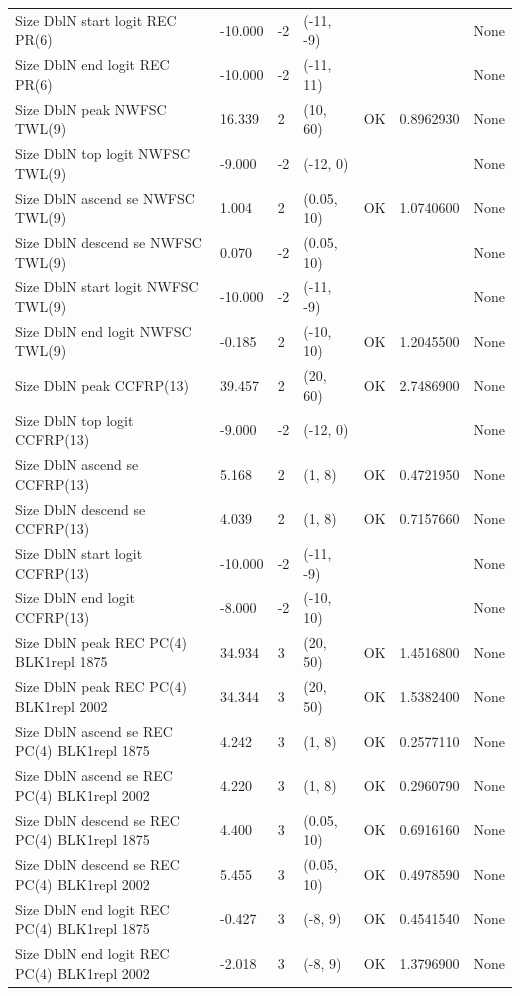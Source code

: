 \documentclass[11pt,
  english,
  a4paper,
]{article}
\begin{document}
\begin{landscape}
\begin{longtable}[t]{>{\raggedright\arraybackslash}p{8.5cm}lllll>{\raggedright\arraybackslash}p{4cm}}
Size DblN start logit REC PR(6) & -10.000 & -2 & (-11, -9) &  &  & None\\
Size DblN end logit REC PR(6) & -10.000 & -2 & (-11, 11) &  &  & None\\
Size DblN peak NWFSC TWL(9) & 16.339 & 2 & (10, 60) & OK & 0.8962930 & None\\
Size DblN top logit NWFSC TWL(9) & -9.000 & -2 & (-12, 0) &  &  & None\\
Size DblN ascend se NWFSC TWL(9) & 1.004 & 2 & (0.05, 10) & OK & 1.0740600 & None\\
Size DblN descend se NWFSC TWL(9) & 0.070 & -2 & (0.05, 10) &  &  & None\\
Size DblN start logit NWFSC TWL(9) & -10.000 & -2 & (-11, -9) &  &  & None\\
Size DblN end logit NWFSC TWL(9) & -0.185 & 2 & (-10, 10) & OK & 1.2045500 & None\\
Size DblN peak CCFRP(13) & 39.457 & 2 & (20, 60) & OK & 2.7486900 & None\\
Size DblN top logit CCFRP(13) & -9.000 & -2 & (-12, 0) &  &  & None\\
Size DblN ascend se CCFRP(13) & 5.168 & 2 & (1, 8) & OK & 0.4721950 & None\\
Size DblN descend se CCFRP(13) & 4.039 & 2 & (1, 8) & OK & 0.7157660 & None\\
Size DblN start logit CCFRP(13) & -10.000 & -2 & (-11, -9) &  &  & None\\
Size DblN end logit CCFRP(13) & -8.000 & -2 & (-10, 10) &  &  & None\\
Size DblN peak REC PC(4) BLK1repl 1875 & 34.934 & 3 & (20, 50) & OK & 1.4516800 & None\\
Size DblN peak REC PC(4) BLK1repl 2002 & 34.344 & 3 & (20, 50) & OK & 1.5382400 & None\\
Size DblN ascend se REC PC(4) BLK1repl 1875 & 4.242 & 3 & (1, 8) & OK & 0.2577110 & None\\
Size DblN ascend se REC PC(4) BLK1repl 2002 & 4.220 & 3 & (1, 8) & OK & 0.2960790 & None\\
Size DblN descend se REC PC(4) BLK1repl 1875 & 4.400 & 3 & (0.05, 10) & OK & 0.6916160 & None\\
Size DblN descend se REC PC(4) BLK1repl 2002 & 5.455 & 3 & (0.05, 10) & OK & 0.4978590 & None\\
Size DblN end logit REC PC(4) BLK1repl 1875 & -0.427 & 3 & (-8, 9) & OK & 0.4541540 & None\\
Size DblN end logit REC PC(4) BLK1repl 2002 & -2.018 & 3 & (-8, 9) & OK & 1.3796900 & None\\

\end{longtable}
\end{landscape}
\end{document}
